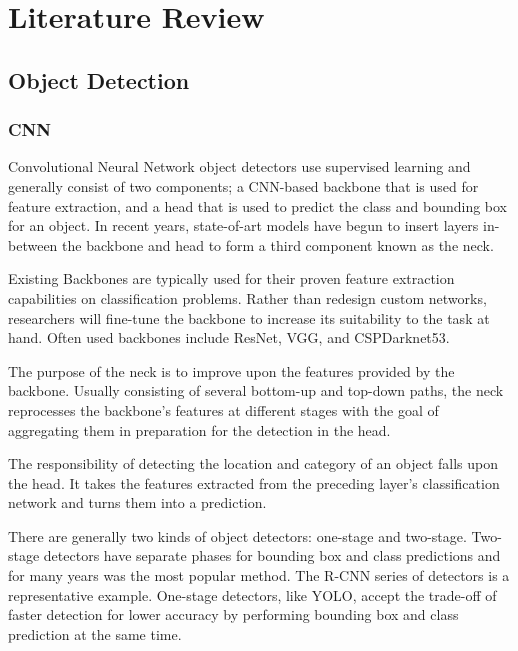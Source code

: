 \documentclass{thesis}
\begin{document}

\chapter{Literature Review}

\section{Object Detection}

\subsection{CNN}

Convolutional Neural Network object detectors use supervised learning and generally consist of two components; a CNN-based backbone that is used for feature extraction, and a head that is used to predict the class and bounding box for an object. In recent years, state-of-art models have begun to insert layers in-between the backbone and head to form a third component known as the neck.

Existing Backbones are typically used for their proven feature extraction capabilities on classification problems. Rather than redesign custom networks, researchers will fine-tune the backbone to increase its suitability to the task at hand. Often used backbones include ResNet, VGG, and CSPDarknet53\cite{zhu2021tphyolov5}.

The purpose of the neck is to improve upon the features provided by the backbone. Usually consisting of several bottom-up and top-down paths, the neck reprocesses the backbone's features at different stages with the goal of aggregating them in preparation for the detection in the head.

The responsibility of detecting the location and category of an object falls upon the head. It takes the features extracted from the preceding layer's classification network and turns them into a prediction. 

There are generally two kinds of object detectors: one-stage and two-stage. Two-stage detectors have separate phases for bounding box and class predictions and for many years was the most popular method. The R-CNN series of detectors\cite{frcnn} is a representative example. One-stage detectors, like YOLO, accept the trade-off of faster detection for lower accuracy by performing bounding box and class prediction at the same time.
\end{document}
